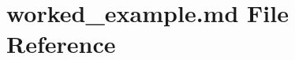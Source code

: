 \hypertarget{worked__example_8md}{}\section{worked\+\_\+example.\+md File Reference}
\label{worked__example_8md}
